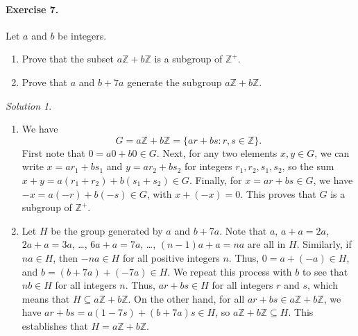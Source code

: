 \documentclass[11pt]{report}
\def\Z{\mathbb{Z}}
\theoremstyle{remark}
\newtheorem*{solution}{Solution}
\begin{document}
    \paragraph{Exercise 7.} Let $a$ and $b$ be integers.
    \begin{enumerate}
        \itemsep0em
        \item Prove that the subset $a\Z + b\Z$ is a subgroup of $\Z^+$.
        \item Prove that $a$ and $b + 7a$ generate the subgroup $a\Z + b\Z$.
    \end{enumerate}
    \begin{solution} \mbox{}
        \begin{enumerate}
            \item We have \[
                G = a\Z + b\Z = \{ar + bs: r, s \in \Z\}.
            \] First note that $0 = a0 + b0 \in G$. Next, for any two elements $x, y
            \in G$, we can write $x = ar_1 + bs_1$ and $y = ar_2 + bs_2$ for
            integers $r_1, r_2, s_1, s_2$, so the sum $x + y = a(r_1 + r_2) + b(s_1
            + s_2) \in G$. Finally, for $x = ar + bs \in G$, we have $-x = a(-r) +
            b(-s) \in G$, with $x + (-x) = 0$. This proves that $G$ is a subgroup of
            $\Z^+$.

            \item Let $H$ be the group generated by $a$ and $b + 7a$. Note that $a$,
            $a + a = 2a$, $2a + a = 3a$, \dots, $6a + a = 7a$, \dots, $(n - 1)a + a
            = na$ are all in $H$. Similarly, if $na \in H$, then $-na \in H$ for all
            positive integers $n$. Thus, $0 = a + (-a) \in H$, and $b = (b + 7a) +
            (-7a) \in H$. We repeat this process with $b$ to see that $nb \in H$ for
            all integers $n$. Thus, $ar + bs \in H$ for all integers $r$ and $s$,
            which means that $H \subseteq a\Z + b\Z$. On the other hand, for all $ar
            + bs \in a\Z + b\Z$, we have $ar + bs = a(1 - 7s) + (b + 7a)s \in H$, so
            $a\Z + b\Z \subseteq H$. This establishes that $H = a\Z + b\Z$.
        \end{enumerate}
    \end{solution}
\end{document}
